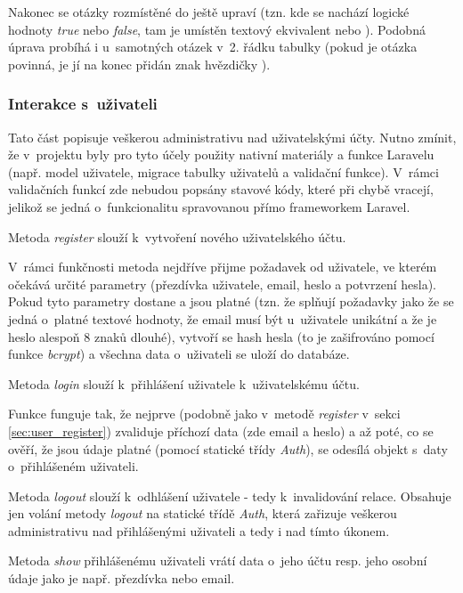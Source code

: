 			Nakonec se otázky rozmístěné do  ještě upraví (tzn. kde se nachází logické hodnoty \textit{true} nebo \textit{false}, tam je umístěn textový ekvivalent  nebo ). Podobná úprava probíhá i u~samotných otázek v~2. řádku tabulky (pokud je otázka povinná, je jí na konec přidán znak hvězdičky \uv{*}).
			
		\subsubsection{Interakce s~uživateli}
		Tato část popisuje veškerou administrativu nad uživatelskými účty. Nutno zmínit, že v~projektu byly pro tyto účely použity nativní materiály a funkce Laravelu (např. model uživatele, migrace tabulky uživatelů a validační funkce). V~rámci validačních funkcí zde nebudou popsány stavové kódy, které při chybě vracejí, jelikož se jedná o~funkcionalitu spravovanou přímo frameworkem Laravel.
		
			\label{sec:user_register}
			Metoda \textit{register} slouží k~vytvoření nového uživatelského účtu.
			
			V~rámci funkčnosti metoda nejdříve přijme požadavek od uživatele, ve kterém očekává určité parametry (přezdívka uživatele, email, heslo a potvrzení hesla). Pokud tyto parametry dostane a jsou platné (tzn. že splňují požadavky jako že se jedná o~platné textové hodnoty, že email musí být u~uživatele unikátní a že je heslo alespoň 8 znaků dlouhé), vytvoří se hash hesla (to je zašifrováno pomocí funkce \textit{bcrypt}) a všechna data o~uživateli se uloží do databáze. 
			
			\label{sec:user_login}
			Metoda \textit{login} slouží k~přihlášení uživatele k~uživatelskému účtu. 
			
			Funkce funguje tak, že nejprve (podobně jako v~metodě \textit{register} v~sekci \ref{sec:user_register}) zvaliduje příchozí data (zde email a heslo) a až poté, co se ověří, že jsou údaje platné (pomocí statické třídy \textit{Auth}), se odesílá objekt s~daty o~přihlášeném uživateli.
			
			\label{sec:user_logout}
			Metoda \textit{logout} slouží k~odhlášení uživatele - tedy k~invalidování relace. Obsahuje jen volání metody \textit{logout} na statické třídě \textit{Auth}, která zařizuje veškerou administrativu nad přihlášenými uživateli a tedy i nad tímto úkonem.
			
			\label{sec:user_show}
			Metoda \textit{show} přihlášenému uživateli vrátí data o~jeho účtu resp. jeho osobní údaje jako je např. přezdívka nebo email.
			
